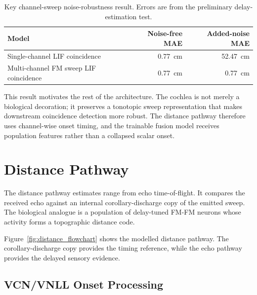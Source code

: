 \begin{table}[h]
    \centering
    \caption{Key channel-sweep noise-robustness result. Errors are from the preliminary delay-estimation test.}
    \label{tab:sweep_noise_key_result}
    \begin{tabular}{lrr}
        \toprule
        Model & Noise-free MAE & Added-noise MAE \\
        \midrule
        Single-channel LIF coincidence & 0.77~cm & 52.47~cm \\
        Multi-channel FM sweep LIF coincidence & 0.77~cm & 0.77~cm \\
        \bottomrule
    \end{tabular}
\end{table}

This result motivates the rest of the architecture. The cochlea is not merely a biological decoration; it preserves a tonotopic sweep representation that makes downstream coincidence detection more robust. The distance pathway therefore uses channel-wise onset timing, and the trainable fusion model receives population features rather than a collapsed scalar onset.

\section{Distance Pathway}

The distance pathway estimates range from echo time-of-flight. It compares the received echo against an internal corollary-discharge copy of the emitted sweep. The biological analogue is a population of delay-tuned FM-FM neurons whose activity forms a topographic distance code.



Figure~\ref{fig:distance_flowchart} shows the modelled distance pathway. The corollary-discharge copy provides the timing reference, while the echo pathway provides the delayed sensory evidence.

\subsection{VCN/VNLL Onset Processing}

